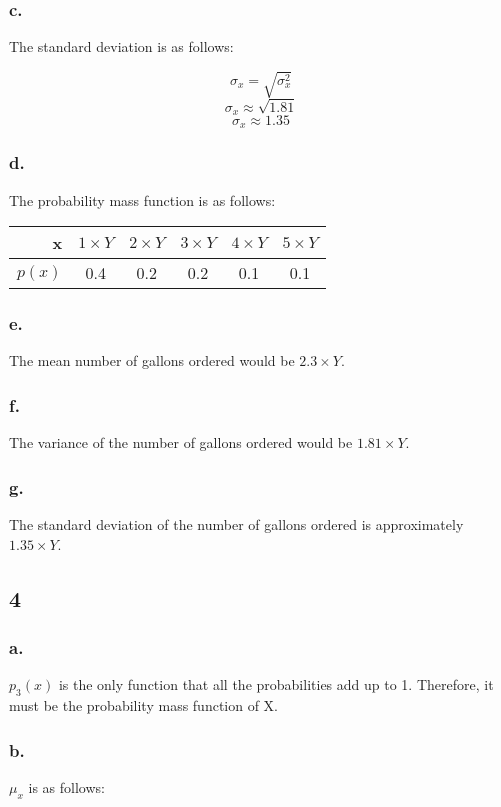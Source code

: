 \documentclass[11pt]{article}
\begin{document}
\subsubsection{c.}
The standard deviation is as follows:

\[ \sigma_x = \sqrt{\sigma^2_x} \]
\[ \sigma_x \approx \sqrt{1.81} \]
\[ \sigma_x \approx 1.35 \]

\subsubsection{d.}
The probability mass function is as follows:

\begin{tabular}{r|ccccc}
    x & $1 \times Y$ & $2 \times Y$ & $3 \times Y$ & $4 \times Y$ & $5 \times Y$ \\
    \hline
    $p(x)$ & 0.4 & 0.2 & 0.2 & 0.1 & 0.1
\end{tabular}

\subsubsection{e.}
The mean number of gallons ordered would be $2.3 \times Y$. 

\subsubsection{f.}
The variance of the number of gallons ordered would be $1.81 \times Y$. 

\subsubsection{g.}
The standard deviation of the number of gallons ordered is approximately 
$1.35 \times Y$. 

\subsection{4}
\subsubsection{a.}
$p_3(x)$ is the only function that all the probabilities add up to 1. Therefore,
it must be the probability mass function of X.

\subsubsection{b.}
$\mu_x$ is as follows:
\end{document}

